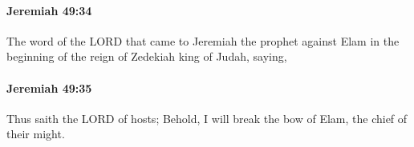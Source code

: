 		\paragraph{Jeremiah 49:34} %
			\label{JEREMIAH-49-34}

			The word of the LORD that came to Jeremiah the prophet against Elam in the beginning of the reign of Zedekiah king of Judah, saying,


		\paragraph{Jeremiah 49:35} %
			\label{JEREMIAH-49-35}

			Thus saith the LORD of hosts; Behold, I will break the bow of Elam, the chief of their might.


